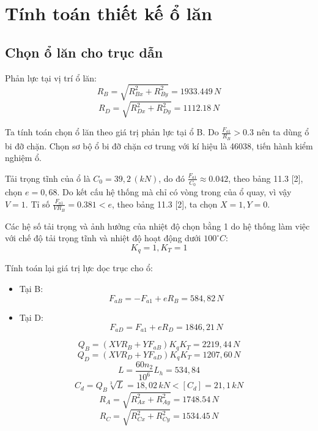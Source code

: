 \chapter{Tính toán thiết kế ổ lăn}
\section{Chọn ổ lăn cho trục dẫn}

\noindent Phản lực tại vị trí ổ lăn:
\begin{equation}
    R_B = \sqrt{R_{Bx}^2 + R_{By}^2} = 1933.449 \, N
\end{equation}
\begin{equation}
    R_D = \sqrt{R_{Dx}^2 + R_{Dy}^2} = 1112.18 \, N
\end{equation}

\noindent Ta tính toán chọn ổ lăn theo giá trị phản lực tại ổ B. Do $\frac{F_{a1}}{R_B} > 0.3$ nên ta dùng ổ bi đỡ chặn. Chọn sơ bộ ổ bi đỡ chặn cơ trung với kí hiệu là 46038, tiến hành kiểm nghiệm ổ.

\noindent Tải trọng tĩnh của ổ là $C_0 = 39,2 \, (kN)$, do đó $\frac{F_{a1}}{C_0} \approx 0.042$, theo bảng 11.3 [2], chọn $e = 0,68$. Do kết cấu hệ thống mà chỉ có vòng trong của ổ quay, vì vậy $V = 1$. Tỉ số $\frac{F_{a1}}{VR_B} = 0.381 < e$, theo bảng 11.3 [2], ta chọn $X = 1, Y = 0$.

\noindent Các hệ số tải trọng và ảnh hưởng của nhiệt độ chọn bằng 1 do hệ thống làm việc với chế độ tải trọng tĩnh và nhiệt độ hoạt động dưới $100^\circ C$:
$$ K_q = 1, K_T = 1 $$

\noindent Tính toán lại giá trị lực dọc trục cho ổ:
\begin{itemize}
    \item Tại B:
    \begin{equation}
        F_{aB} = -F_{a1} + eR_B = 584,82 \, N
    \end{equation}
    \item Tại D:
    \begin{equation}
        F_{aD} = F_{a1} + eR_D = 1846,21 \, N
    \end{equation}
\end{itemize}

\begin{equation}
    Q_B = (XVR_B + YF_{aB})K_qK_T = 2219,44 \, N
\end{equation}
\begin{equation}
    Q_D = (XVR_D + YF_{aD})K_qK_T = 1207,60 \, N
\end{equation}
\begin{equation}
    L = \frac{60n_2}{10^6} L_h = 534,84
\end{equation}
\begin{equation}
    C_d = Q_B \sqrt[3]{L} = 18,02 \, kN < [C_d] = 21,1 \, kN
\end{equation}
\begin{equation}
    R_A = \sqrt{R_{Ax}^2 + R_{Ay}^2} = 1748.54 \, N
\end{equation}
\begin{equation}
    R_C = \sqrt{R_{Cx}^2 + R_{Cy}^2} = 1534.45 \, N
\end{equation}

